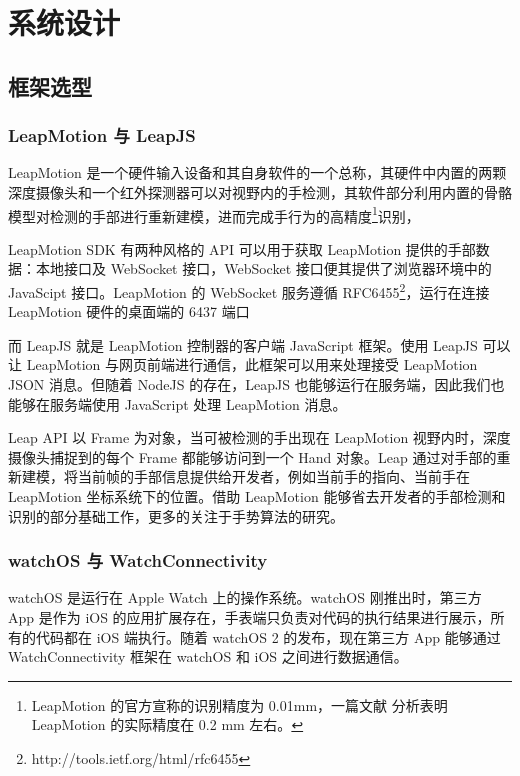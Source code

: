 \chapter{系统设计}

\section{框架选型}

\subsection{LeapMotion 与 LeapJS}

LeapMotion \cite{Leap:2016}是一个硬件输入设备和其自身软件的一个总称，其硬件中内置的两颗深度摄像头和一个红外探测器可以对视野内的手检测，其软件部分利用内置的骨骼模型对检测的手部进行重新建模，进而完成手行为的高精度\footnote{ LeapMotion 的官方宣称的识别精度为 0.01mm，一篇文献\cite{weichert2013analysis} 分析表明 LeapMotion 的实际精度在 0.2 mm 左右。}识别，

LeapMotion SDK 有两种风格的 API 可以用于获取 LeapMotion 提供的手部数据：本地接口及 WebSocket 接口，WebSocket 接口便其提供了浏览器环境中的 JavaScipt 接口。LeapMotion 的 WebSocket 服务遵循 RFC6455\footnote{http://tools.ietf.org/html/rfc6455}，运行在连接 LeapMotion 硬件的桌面端的 6437 端口

而 LeapJS 就是 LeapMotion 控制器的客户端 JavaScript 框架。使用 LeapJS 可以让 LeapMotion 与网页前端进行通信，此框架可以用来处理接受 LeapMotion JSON 消息。但随着 NodeJS 的存在，LeapJS 也能够运行在服务端，因此我们也能够在服务端使用 JavaScript 处理 LeapMotion 消息。

Leap API 以 Frame 为对象，当可被检测的手出现在 LeapMotion 视野内时，深度摄像头捕捉到的每个 Frame 都能够访问到一个 Hand 对象。Leap 通过对手部的重新建模，将当前帧的手部信息提供给开发者，例如当前手的指向、当前手在 LeapMotion 坐标系统下的位置。借助 LeapMotion 能够省去开发者的手部检测和识别的部分基础工作，更多的关注于手势算法的研究\cite{xusuibin2015,panjiajia2015,huhong2015}。

\subsection{watchOS 与 WatchConnectivity}

watchOS 是运行在 Apple Watch 上的操作系统。watchOS 刚推出时，第三方 App 是作为 iOS 的应用扩展存在，手表端只负责对代码的执行结果进行展示，所有的代码都在 iOS 端执行。随着 watchOS 2 的发布，现在第三方 App 能够通过 WatchConnectivity 框架在 watchOS 和 iOS 之间进行数据通信。

